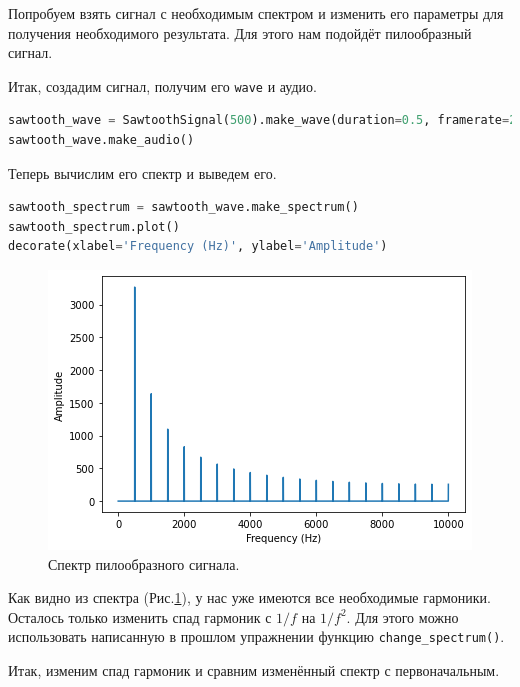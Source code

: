 \documentclass[a4paper, 14pt]{extarticle}
\begin{document}
    Попробуем взять сигнал с необходимым спектром и изменить его параметры для получения необходимого результата.
    Для этого нам подойдёт пилообразный сигнал.

    Итак, создадим сигнал, получим его \texttt{wave} и аудио.

    \begin{lstlisting}[language=Python, caption= Создание пилообразного сигнала и получение его \texttt{wave}., label={lst:task6_create_wave}]
sawtooth_wave = SawtoothSignal(500).make_wave(duration=0.5, framerate=20000)
sawtooth_wave.make_audio()
    \end{lstlisting}

    Теперь вычислим его спектр и выведем его.

    \begin{lstlisting}[language=Python, caption= Вычисленине и вывод спектра., label={lst:task6_sawtooth_spectrum}]
sawtooth_spectrum = sawtooth_wave.make_spectrum()
sawtooth_spectrum.plot()
decorate(xlabel='Frequency (Hz)', ylabel='Amplitude')
    \end{lstlisting}

    \begin{figure}[h]
        \centering
        \includegraphics[width=0.8\linewidth]{resources/Images/task6_sawtooth_spectrum}
        \caption{Спектр пилообразного сигнала.}
        \label{fig:task6_sawtooth_spectrum}
    \end{figure}

    Как видно из спектра (Рис.\ref{fig:task6_sawtooth_spectrum}), у нас уже имеются все необходимые гармоники.
    Осталось только изменить спад гармоник с $1/f$ на $1/f^2$. Для этого можно использовать написанную в прошлом
    упражнении функцию \texttt{change\_spectrum()}.

    Итак, изменим спад гармоник и сравним изменённый спектр с первоначальным.
\end{document}
